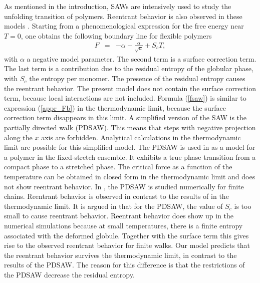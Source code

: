 \documentclass[doublecol,figures]{epl2}
\begin{document}
As mentioned in the introduction, SAWs are intensively used to study the
unfolding transition of polymers. Reentrant behavior is also observed in these
models \cite{referee6,referee7,referee8}. Starting from a phenomenological
expression for the free energy near $T=0$, one obtains the following boundary
line for flexible polymers
\cite{referee6,referee12}
\begin{eqnarray}\label{fsaw}
F&=&-\alpha+\frac\alpha{\sqrt n}+S_cT,
\end{eqnarray}
with $\alpha$ a negative model parameter. The second term is a surface
correction term. The last term is a contribution due to the residual entropy of
the globular phase, with $S_c$ the entropy per monomer. The presence of
the residual entropy causes the reentrant behavior. The present model does
not contain the surface correction term, because local interactions are not
included. Formula (\ref{fsaw}) is similar to expression (\ref{appr_Fb}) in the
thermodynamic limit, because the surface correction term disappears in this
limit. A simplified version of the SAW is the partially directed walk (PDSAW).
This means that steps with negative projection along the $x$ axis are forbidden.
Analytical calculations in the thermodynamic limit are possible for this
simplified model. The PDSAW is used in \cite{referee13} as a model for a polymer
in the fixed-stretch ensemble. It exhibits a true phase transition from a compact
phase to a stretched phase. The critical force as a function of the temperature
can be obtained in closed form in the thermodynamic limit and does not show
reentrant behavior. In \cite{referee12}, the PDSAW is studied numerically for
finite chains. Reentrant behavior is observed in contrast to the results of
\cite{referee13} in the thermodynamic limit. It is argued in \cite{referee12}
that for the PDSAW, the value of $S_c$ is too small to cause reentrant behavior.
Reentrant behavior does show up in the numerical simulations because at small
temperatures, there is a finite entropy associated with the deformed globule.
Together with the surface term this gives rise to the observed reentrant
behavior for finite walks. Our model predicts that the reentrant behavior
survives the thermodynamic limit, in contrast to the results of the PDSAW. The
reason for this difference is that the restrictions of the PDSAW decrease the
residual entropy. 
\end{document}
